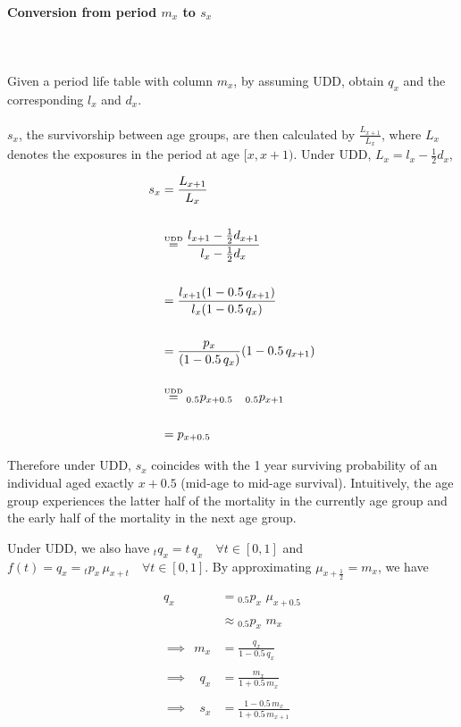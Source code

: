 \documentclass[12pt,a4paper]{article}
\date{\vspace{-5ex}}
\begin{document}
\paragraph{Conversion from period $m_{x}$ to $s_{x}$} \\~\\
Given a period life table with column $m_x$, by assuming UDD, obtain $q_x$ and the corresponding $l_x$ and $d_x$.
\\~\\
$s_x$, the survivorship between age groups, are then calculated by $\frac{L_{x+1}}{L_{x}}$, where $L_x$ denotes the exposures in the period at age $[x, x+1)$. Under UDD, $L_x = l_x - \frac{1}{2} d_x$,

\begin{align*}
s_x &= \frac{L_{x+1}}{L_x} \\~\\
	&\stackrel{\smash{\scriptscriptstyle\mathrm{UDD}}}{=} \frac{l_{x+1} - \frac{1}{2} d_{x+1}}{l_x - \frac{1}{2} d_x} \\~\\
	&= \frac{l_{x+1} (1 - 0.5 \, q_{x+1})}{l_x(1 - 0.5 \, q_x)} \\~\\
	&= \frac{p_x}{(1 - 0.5 \, q_x)} (1 - 0.5 \, q_{x+1}) \\~\\
	&\stackrel{\smash{\scriptscriptstyle\mathrm{UDD}}}{=} {_{0.5}p_{x+0.5}} \quad _{0.5}p_{x+1} \\~\\\ 
	&= p_{x+0.5}
\end{align*}

Therefore under UDD, $s_x$ coincides with the 1 year surviving probability of an individual aged exactly $x+0.5$ (mid-age to mid-age survival). Intuitively, the age group experiences the latter half of the mortality in the currently age group and the early half of the mortality in the next age group.

Under UDD, we also have $_tq_x = t \, q_x \quad \forall t \in [0,1]$ and $f(t) = q_x = {_tp_x} \, \mu_{x+t} \quad \forall t \in [0,1]$. By approximating $\mu_{x+\frac{1}{2}} = m_x$, we have

\begin{align*}
q_x &=  {_{0.5}p_x} \, \, \mu_{x+0.5} \\~\\
	&\approx {_{0.5}p_x} \, \, m_x \\~\\
\implies  \phantom{q} m_x &= \frac{q_x}{1-0.5 \, q_x} \\~\\
\implies  \phantom{m} q_x &= \frac{m_x}{1+0.5 \, m_x} \\~\\
\implies  \phantom{m} s_x &= \frac{1 - 0.5 \, m_x}{1 + 0.5 \, m_{x+1}}
\end{align*}
\end{document}
